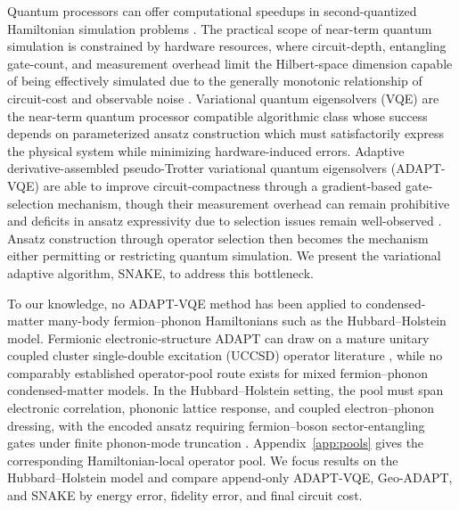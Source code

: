 \documentclass[
  reprint,
  amsmath,
  amssymb,
  aps,
  pra,
  nofootinbib,
  superscriptaddress,
  floatfix
]{revtex4-2}
\begin{document}
Quantum processors can offer computational speedups in second-quantized Hamiltonian simulation problems \cite{Lloyd1996,AspuruGuzik2005}. The practical scope of near-term quantum simulation is constrained by hardware resources, where circuit-depth, entangling gate-count, and measurement overhead limit the Hilbert-space dimension capable of being effectively simulated due to the generally monotonic relationship of circuit-cost and observable noise \cite{Preskill2018NISQ,Cerezo2021VQA,Huggins2021Measurements}. Variational quantum eigensolvers (VQE) are the near-term quantum processor compatible algorithmic class whose success depends on parameterized ansatz construction which must satisfactorily express the physical system while minimizing hardware-induced errors.  Adaptive derivative-assembled pseudo-Trotter variational quantum eigensolvers (ADAPT-VQE) are able to improve circuit-compactness through a gradient-based gate-selection mechanism, though their measurement overhead can remain prohibitive and deficits in ansatz expressivity due to selection issues remain well-observed \cite{Grimsley2019,Tang2021,Yordanov2021,Feniou2023,Ikhtiarudin2025ShotEfficient}.  Ansatz construction through operator selection then becomes the mechanism either permitting or restricting quantum simulation. We present the variational adaptive algorithm, SNAKE, to address this bottleneck.


To our knowledge, no ADAPT-VQE method has been applied to condensed-matter many-body fermion--phonon Hamiltonians such as the Hubbard--Holstein model. Fermionic electronic-structure ADAPT can draw on a mature unitary coupled cluster single-double excitation (UCCSD) operator literature \cite{Romero2018UCC,Grimsley2019}, while no comparably established operator-pool route exists for mixed fermion--phonon condensed-matter models. In the Hubbard--Holstein setting, the pool must span electronic correlation, phononic lattice response, and coupled electron--phonon dressing, with the encoded ansatz requiring fermion--boson sector-entangling gates under finite phonon-mode truncation \cite{Hubbard1963,Holstein1959a,Holstein1959b}. Appendix~\ref{app:pools} gives the corresponding Hamiltonian-local operator pool. We focus results on the Hubbard--Holstein model and compare append-only ADAPT-VQE, Geo-ADAPT, and SNAKE by energy error, fidelity error, and final circuit cost.
\end{document}
